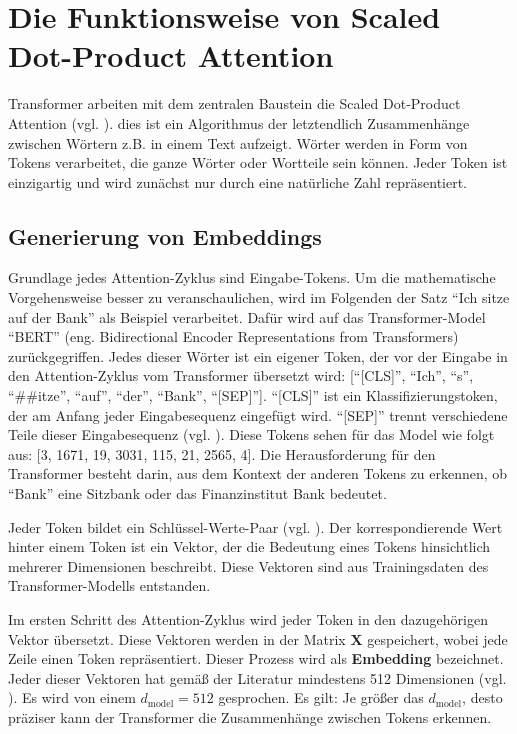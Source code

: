 \chapter{Die Funktionsweise von Scaled Dot-Product Attention}

Transformer arbeiten mit dem zentralen Baustein die Scaled Dot-Product Attention (vgl. \cite[S. 4]{attention}).
dies ist ein Algorithmus der letztendlich Zusammenhänge zwischen Wörtern z.B. in einem Text aufzeigt.
Wörter werden in Form von Tokens verarbeitet, die ganze Wörter oder Wortteile sein können.
Jeder Token ist einzigartig und wird zunächst nur durch eine natürliche Zahl repräsentiert.

\section{Generierung von Embeddings}

Grundlage jedes Attention-Zyklus sind Eingabe-Tokens.
Um die mathematische Vorgehensweise besser zu veranschaulichen, wird im Folgenden der Satz \enquote{Ich sitze auf der Bank} als Beispiel verarbeitet.
Dafür wird auf das Transformer-Model \enquote{BERT} (eng. Bidirectional Encoder Representations from Transformers) zurückgegriffen.
Jedes dieser Wörter ist ein eigener Token, der vor der Eingabe in den Attention-Zyklus vom Transformer übersetzt wird:
[\enquote{[CLS]}, \enquote{Ich}, \enquote{s}, \enquote{##itze}, \enquote{auf}, \enquote{der}, \enquote{Bank}, \enquote{[SEP]}].  
\enquote{[CLS]} ist ein Klassifizierungstoken, der am Anfang jeder Eingabesequenz eingefügt wird.
\enquote{[SEP]} trennt verschiedene Teile dieser Eingabesequenz (vgl. \cite[S. 221]{paass.2020}).
Diese Tokens sehen für das Model wie folgt aus: [3, 1671, 19, 3031, 115, 21, 2565, 4].
Die Herausforderung für den Transformer besteht darin, aus dem Kontext der anderen Tokens zu erkennen, ob \enquote{Bank} eine Sitzbank oder das Finanzinstitut Bank bedeutet.

Jeder Token bildet ein Schlüssel-Werte-Paar (vgl. \cite[S. 172]{paass.2020}).
Der korrespondierende Wert hinter einem Token ist ein Vektor, der die Bedeutung eines Tokens hinsichtlich mehrerer Dimensionen beschreibt.  
Diese Vektoren sind aus Trainingsdaten des Transformer-Modells entstanden.

Im ersten Schritt des Attention-Zyklus wird jeder Token in den dazugehörigen Vektor übersetzt.  
Diese Vektoren werden in der Matrix $\mathbf{X}$ gespeichert, wobei jede Zeile einen Token repräsentiert.  
Dieser Prozess wird als \textbf{Embedding} bezeichnet.  
Jeder dieser Vektoren hat gemäß der Literatur mindestens 512 Dimensionen (vgl. \cite[S. 3]{attention}).  
Es wird von einem \( d_{\text{model}} = 512 \) gesprochen.  
Es gilt: Je größer das \( d_{\text{model}} \), desto präziser kann der Transformer die Zusammenhänge zwischen Tokens erkennen.

